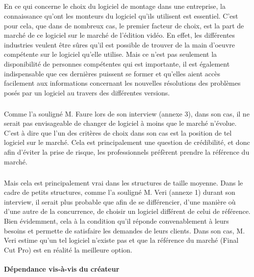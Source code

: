   \subparagraph{}
  En ce qui concerne le choix du logiciel de montage dans une entreprise,
  la connaissance qu'ont les monteurs du logiciel qu'ils utilisent est essentiel.
  C'est pour cela, que dans de nombreux cas, le premier facteur de choix, est la part de marché de ce
  logiciel sur le marché de l'édition vidéo. En effet, les différentes industries veulent être sûres
  qu'il est possible de trouver de la main d'oeuvre compétente sur le logiciel qu'elle utilise.
  Mais ce n'est pas seulement la disponibilité de personnes compétentes qui est importante,
  il est également indispensable que ces dernières puissent se former et qu'elles aient
  accès facilement aux informations concernant les nouvelles résolutions des problèmes posés
  par un logiciel au travers des différentes versions.

  \subparagraph{}
  Comme l'a souligné M. Faure lors de son interview (annexe 3), dans son cas, il ne serait pas envisageable de
  changer de logiciel à moins que le marché n'évolue. C'est à dire que l'un des critères de choix dans son cas
  est la position de tel logiciel sur le marché. Cela est principalement une question de crédibilité, et donc
  afin d'éviter la prise de risque, les professionnels préfèrent prendre la référence du marché.

  \subparagraph{}

  Mais cela est principalement vrai dans les structures de taille moyenne.
  Dans le cadre de petits structures, comme l'a souligné M. Veri (annexe 1) durant son interview,
  il serait plus probable que afin de se différencier, d'une manière où d'une autre de la concurrence,
  de choisir un logiciel
  différent de celui de référence. Bien évidemment, cela à la condition qu'il réponde convenablement
  à leurs besoins et permette de satisfaire les demandes de leurs clients. Dans son cas, M. Veri estime
  qu'un tel logiciel n'existe pas  et que la référence du marché (Final Cut Pro) est en
  réalité la meilleure option.

  \paragraph{Dépendance vis-à-vis du créateur}

  \subparagraph{}


